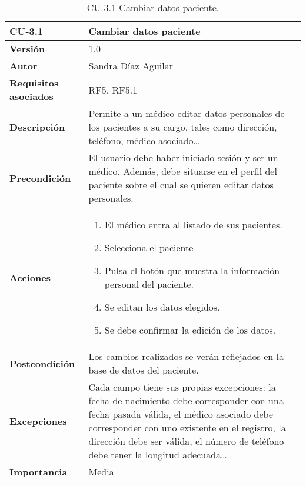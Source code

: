 \begin{table}[p]
	\centering
	\begin{tabularx}{\linewidth}{ p{} p{} }
		\toprule
		\textbf{CU-3.1}    & \textbf{Cambiar datos paciente}\\
		\toprule
		\textbf{Versión}              & 1.0    \\
		\textbf{Autor}                & Sandra Díaz Aguilar \\
		\textbf{Requisitos asociados} & RF5, RF5.1\\
		\textbf{Descripción}          & Permite a un médico editar datos personales de los pacientes a su cargo, tales como dirección, teléfono, médico asociado\ldots  \\
		\textbf{Precondición}         & El usuario debe haber iniciado sesión y ser un médico. Además, debe situarse en el perfil del paciente sobre el cual se quieren editar datos personales. \\
		\textbf{Acciones}             &
		\begin{enumerate}
			\def\labelenumi{\arabic{enumi}.}
			\tightlist
			\item El médico entra al listado de sus pacientes.
			\item Selecciona el paciente
            \item Pulsa el botón que muestra la información personal del paciente. 
			\item Se editan los datos elegidos. 
            \item Se debe confirmar la edición de los datos. 
		\end{enumerate}\\
		\textbf{Postcondición}        & Los cambios realizados se verán reflejados en la base de datos del paciente. \\
		\textbf{Excepciones}          & Cada campo tiene sus propias excepciones: la fecha de nacimiento debe corresponder con una fecha pasada válida, el médico asociado debe corresponder con uno existente en el registro, la dirección debe ser válida, el número de teléfono debe tener la longitud adecuada\ldots  \\
		\textbf{Importancia}          & Media \\
		\bottomrule
	\end{tabularx}
	\caption{CU-3.1 Cambiar datos paciente.}
\end{table}



